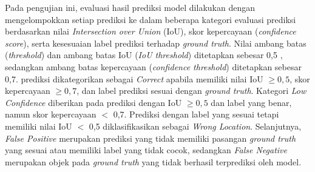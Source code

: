 Pada pengujian ini, evaluasi hasil prediksi model dilakukan dengan mengelompokkan setiap prediksi ke dalam beberapa kategori evaluasi prediksi berdasarkan nilai \textit{Intersection over Union} (IoU), skor kepercayaan (\textit{confidence score}), serta kesesuaian label prediksi terhadap \textit{ground truth}. Nilai ambang batas (\textit{threshold}) dan ambang batas IoU (\textit{IoU threshold}) ditetapkan sebesar 0,5 \cite{threshold_pengujian}, sedangkan ambang batas kepercayaan (\textit{confidence threshold}) ditetapkan sebesar 0,7. prediksi dikategorikan sebagai \textit{Correct} apabila memiliki nilai IoU $\geq 0,5$, skor kepercayaan $\geq 0,7$, dan label prediksi sesuai dengan \textit{ground truth}. Kategori \textit{Low Confidence} diberikan pada prediksi dengan IoU $\geq 0,5$ dan label yang benar, namun skor kepercayaan $<$ 0,7. Prediksi dengan label yang sesuai tetapi memiliki nilai IoU $<$ 0,5 diklasifikasikan sebagai \textit{Wrong Location}. Selanjutnya, \textit{False Positive} merupakan prediksi yang tidak memiliki pasangan \textit{ground truth} yang sesuai atau memiliki label yang tidak cocok, sedangkan \textit{False Negative} merupakan objek pada \textit{ground truth} yang tidak berhasil terprediksi oleh model.


